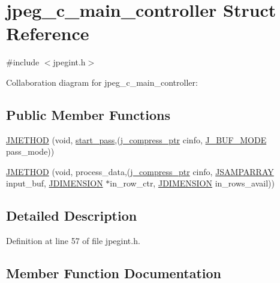 \hypertarget{structjpeg__c__main__controller}{}\section{jpeg\+\_\+c\+\_\+main\+\_\+controller Struct Reference}
\label{structjpeg__c__main__controller}


{\ttfamily \#include $<$jpegint.\+h$>$}



Collaboration diagram for jpeg\+\_\+c\+\_\+main\+\_\+controller\+:
\subsection*{Public Member Functions}
\begin{DoxyCompactItemize}
\item 
\mbox{\hyperlink{structjpeg__c__main__controller_a12d7c719a1598e04dafbddc0c3d6c1d5}{J\+M\+E\+T\+H\+OD}} (void, \mbox{\hyperlink{jddctmgr_8c_a1964f006adb8fb80f57e455f6452aec1}{start\+\_\+pass}},(\mbox{\hyperlink{jpeglib_8h_add2a072c54e3a51550f4975f7ddb91e7}{j\+\_\+compress\+\_\+ptr}} cinfo, \mbox{\hyperlink{jpegint_8h_a1f0803342372ac62b6903c399399c874}{J\+\_\+\+B\+U\+F\+\_\+\+M\+O\+DE}} pass\+\_\+mode))
\item 
\mbox{\hyperlink{structjpeg__c__main__controller_aefb0f62e18af1d6087803ac65bfd9bb9}{J\+M\+E\+T\+H\+OD}} (void, process\+\_\+data,(\mbox{\hyperlink{jpeglib_8h_add2a072c54e3a51550f4975f7ddb91e7}{j\+\_\+compress\+\_\+ptr}} cinfo, \mbox{\hyperlink{jpeglib_8h_ac9d5d1b829ed51769db69a37271a7e91}{J\+S\+A\+M\+P\+A\+R\+R\+AY}} input\+\_\+buf, \mbox{\hyperlink{jmorecfg_8h_a04ed4674f6f1d0d50ec241531e38274f}{J\+D\+I\+M\+E\+N\+S\+I\+ON}} $\ast$in\+\_\+row\+\_\+ctr, \mbox{\hyperlink{jmorecfg_8h_a04ed4674f6f1d0d50ec241531e38274f}{J\+D\+I\+M\+E\+N\+S\+I\+ON}} in\+\_\+rows\+\_\+avail))
\end{DoxyCompactItemize}


\subsection{Detailed Description}


Definition at line 57 of file jpegint.\+h.



\subsection{Member Function Documentation}
\mbox{\label{structjpeg__c__main__controller_a12d7c719a1598e04dafbddc0c3d6c1d5}} 
